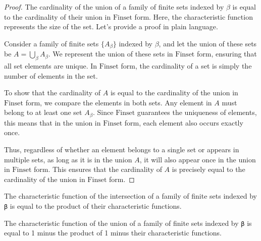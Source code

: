 \begin{proof}
    \leanok
The cardinality of the union of a family of finite sets indexed by \(\beta\) is equal to the cardinality of their union in \(\text{Finset}\) form. Here, the characteristic function represents the size of the set. Let's provide a proof in plain language.

Consider a family of finite sets \(\{A_\beta\}\) indexed by \(\beta\), and let the union of these sets be \(A = \bigcup_\beta A_\beta\). We represent the union of these sets in \(\text{Finset}\) form, ensuring that all set elements are unique. In \(\text{Finset}\) form, the cardinality of a set is simply the number of elements in the set.

To show that the cardinality of \(A\) is equal to the cardinality of the union in \(\text{Finset}\) form, we compare the elements in both sets. Any element in \(A\) must belong to at least one set \(A_\beta\). Since \(\text{Finset}\) guarantees the uniqueness of elements, this means that in the union in \(\text{Finset}\) form, each element also occurs exactly once.

Thus, regardless of whether an element belongs to a single set or appears in multiple sets, as long as it is in the union \(A\), it will also appear once in the union in \(\text{Finset}\) form. This ensures that the cardinality of \(A\) is precisely equal to the cardinality of the union in \(\text{Finset}\) form.

\end{proof}

\begin{lemma}\label{char_fun_FinInter}
  The characteristic function of the intersection of a family of finite sets indexed by \verb|β| is equal to the product of their characteristic functions.
\end{lemma}

\begin{lemma}\label{char_fun_FinUnion}
  The characteristic function of the union of a family of finite sets indexed by \verb|β| is equal to 1 minus the product of 1 minus their characteristic functions.
\end{lemma}

